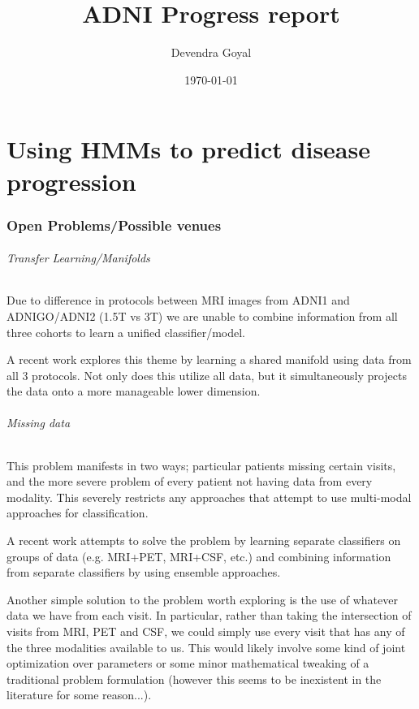 \documentclass[12pt,a4paper]{article}
\title{ADNI Progress report}
\author{Devendra Goyal}
\date{\today}
\begin{document}
\maketitle

\part{Using HMMs to predict disease progression}

\section{Open Problems/Possible venues}

\paragraph{Transfer Learning/Manifolds}

Due to difference in protocols between MRI images from ADNI1 and
ADNIGO/ADNI2 (1.5T vs 3T) we are unable to combine information from
all three cohorts to learn a unified classifier/model.

A recent work explores this theme by learning a shared manifold using
data from all 3 protocols. Not only does this utilize all data, but it
simultaneously projects the data onto a more manageable lower
dimension.

\paragraph{Missing data}

This problem manifests in two ways; particular patients missing
certain visits, and the more severe problem of every patient not
having data from every modality. This severely restricts any
approaches that attempt to use multi-modal approaches for
classification.

A recent work attempts to solve the problem by learning separate
classifiers on groups of data (e.g. MRI+PET, MRI+CSF, etc.) and
combining information from separate classifiers by using ensemble
approaches.

Another simple solution to the problem worth exploring is the use of
whatever data we have from each visit. In particular, rather than
taking the intersection of visits from MRI, PET and CSF, we could
simply use every visit that has any of the three modalities available
to us. This would likely involve some kind of joint optimization over
parameters or some minor mathematical tweaking of a traditional
problem formulation (however this seems to be inexistent in the
literature for some reason...).
\end{document}
